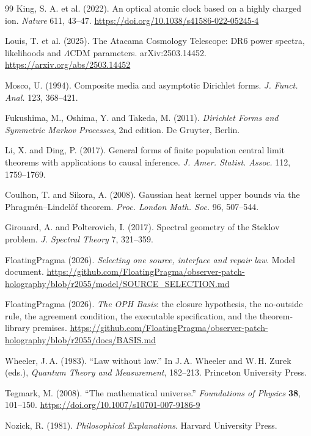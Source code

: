 \documentclass[11pt]{article}
\theoremstyle{definition}
\theoremstyle{remark}
\begin{document}
{\begin{thebibliography}{99}
King, S. A. et al. (2022). An optical atomic clock based on a highly
charged ion. \emph{Nature} 611, 43--47.
\url{https://doi.org/10.1038/s41586-022-05245-4}

Louis, T. et al. (2025). The Atacama Cosmology Telescope: DR6 power spectra,
likelihoods and $\Lambda$CDM parameters. arXiv:2503.14452.
\url{https://arxiv.org/abs/2503.14452}

Mosco, U. (1994). Composite media and asymptotic Dirichlet forms.
\emph{J. Funct. Anal.} 123, 368--421.

Fukushima, M., Oshima, Y. and Takeda, M. (2011). \emph{Dirichlet Forms and
Symmetric Markov Processes}, 2nd edition. De Gruyter, Berlin.

Li, X. and Ding, P. (2017). General forms of finite population central
limit theorems with applications to causal inference. \emph{J. Amer.
Statist. Assoc.} 112, 1759--1769.

Coulhon, T. and Sikora, A. (2008). Gaussian heat kernel upper bounds via the
Phragm\'en--Lindel\"of theorem. \emph{Proc. London Math. Soc.} 96, 507--544.

Girouard, A. and Polterovich, I. (2017). Spectral geometry of the Steklov
problem. \emph{J. Spectral Theory} 7, 321--359.

FloatingPragma (2026). \emph{Selecting one source, interface and repair law}.
Model document.
\url{https://github.com/FloatingPragma/observer-patch-holography/blob/r2055/model/SOURCE_SELECTION.md}

FloatingPragma (2026). \emph{The OPH Basis}: the closure hypothesis, the
no-outside rule, the agreement condition, the executable specification, and
the theorem-library premises.
\url{https://github.com/FloatingPragma/observer-patch-holography/blob/r2055/docs/BASIS.md}

Wheeler, J.\,A. (1983). ``Law without law.'' In J.\,A. Wheeler and
W.\,H. Zurek (eds.), \emph{Quantum Theory and Measurement}, 182--213.
Princeton University Press.

Tegmark, M. (2008). ``The mathematical universe.'' \emph{Foundations of Physics} \textbf{38}, 101--150. \url{https://doi.org/10.1007/s10701-007-9186-9}

Nozick, R. (1981). \emph{Philosophical Explanations}. Harvard University
Press.


\end{thebibliography}}
\end{document}
